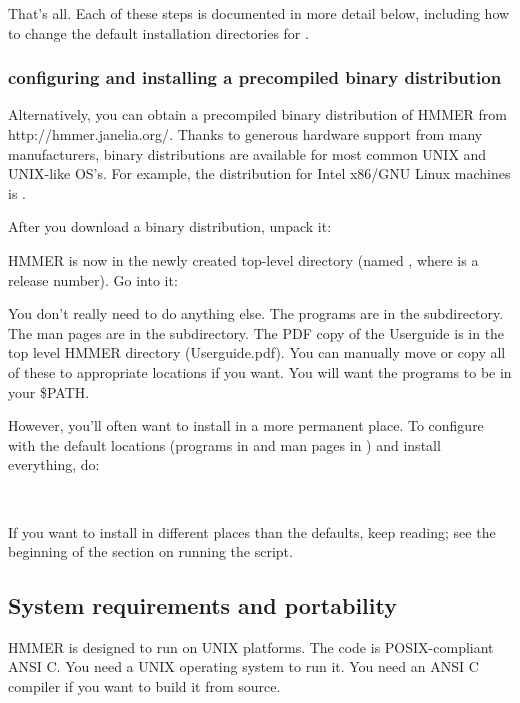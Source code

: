 That's all.  Each of these steps is documented in more detail below,
including how to change the default installation directories for
.

\subsubsection{configuring and installing a precompiled binary distribution}

Alternatively, you can obtain a precompiled binary distribution of
HMMER from 
{http://hmmer.janelia.org/}. Thanks to generous hardware support from
many manufacturers, binary distributions are available for most common
UNIX and UNIX-like OS's. For example, the distribution for Intel
x86/GNU Linux machines is
.

After you download a binary distribution, unpack it:


HMMER is now in the newly created top-level directory (named
, where  is a release number). Go into
it:


You don't really need to do anything else. The programs are in the
 subdirectory. The man pages are in the
 subdirectory.  The PDF copy of the Userguide
is in the top level HMMER directory (Userguide.pdf).  You can manually
move or copy all of these to appropriate locations if you want. You
will want the programs to be in your \$PATH.

However, you'll often want to install in a more permanent place.  To
configure with the default locations (programs in
 and man pages in )
and install everything, do:

\\

If you want to install in different places than the defaults, keep
reading; see the beginning of the section on running the
 script.

\subsection{System requirements and portability}

HMMER is designed to run on UNIX platforms. The code is
POSIX-compliant ANSI C.  You need a UNIX operating system to run it.
You need an ANSI C compiler if you want to build it from source. 

